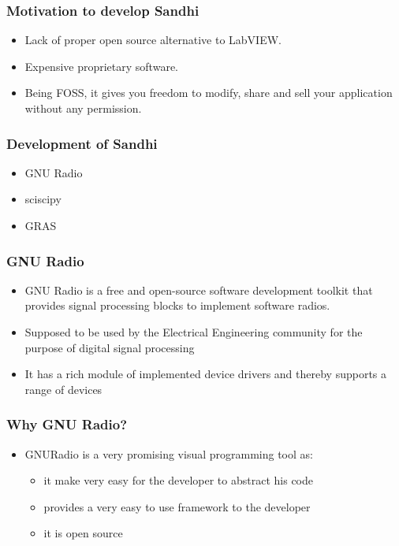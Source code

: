 \documentclass{beamer}
\begin{document}
\begin{frame}
        \frametitle{Motivation to develop Sandhi}
        \begin{itemize}
		\item  Lack of proper open source alternative to LabVIEW.
		\item  Expensive proprietary software.
		\item  Being FOSS, it gives you freedom to modify, share and sell your application without any permission. 
        \end{itemize}
\end{frame}

\begin{frame}
        \frametitle{Development of Sandhi}
        \begin{itemize}
                \item GNU Radio
                \item sciscipy
                \item GRAS
        \end{itemize}
\end{frame}

\begin{frame}
        \frametitle{GNU Radio}
        \begin{itemize}
		\item GNU Radio is a free and open-source software development toolkit that provides signal processing blocks to implement software radios.
		\item Supposed to be used by the Electrical Engineering community for the purpose of digital signal processing 
		\item It has a rich module of implemented device drivers and thereby supports a range of devices
        \end{itemize}
\end{frame}

\begin{frame}
        \frametitle{Why GNU Radio?}
        \begin{itemize}
                \item GNURadio is a very promising visual programming tool as:
        \begin{itemize}
                \item it make very easy for the developer to abstract his code
                \item provides a very easy to use framework to the developer
                \item it is open source
        \end{itemize}
        \end{itemize}
\end{frame}
\end{document}
